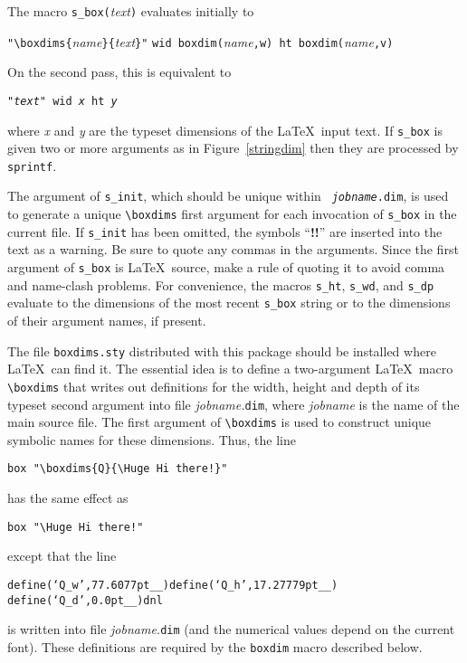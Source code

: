 \noindent The macro \verb|s_box(|{\sl text}\verb|)| evaluates initially to

 \verb|"\boxdims{|{\sl name}\verb|}{|{\sl text}\verb|}"|
  \verb|wid boxdim(|{\sl name}\verb|,w) ht boxdim(|{\sl name}\verb|,v)|

\noindent
On the second pass, this is equivalent to

 {\tt "{\sl text}" wid {\sl x} ht {\sl y}}

 \noindent
 where {\sl x} and {\sl y} are the typeset dimensions of the
 \LaTeX\ input text.  If {\tt s\_box} is given two or more arguments
 as in Figure~\ref{stringdim}
 then they are processed by {\tt sprintf}.

The argument of {\tt s\_init}, which should be unique within {\tt{\sl
jobname}.dim}, is used to generate a unique \verb|\boxdims| first
argument for each invocation of \verb|s_box| in the current file.  If
\verb|s_init| has been omitted, the symbols ``{\bf !!}'' are inserted
into the text as a warning.  Be sure to quote any commas in the
arguments.  Since the first argument of {\tt s\_box} is \LaTeX\ source,
make a rule of quoting it to avoid comma and name-clash problems.  For
convenience, the macros {\tt s\_ht}, {\tt s\_wd}, and {\tt s\_dp}
evaluate to the dimensions of the most recent {\tt s\_box} string or to
the dimensions of their argument names, if present.

The file \verb|boxdims.sty| distributed with this package should be installed
where \LaTeX\ can find it.
The essential idea is to define a two-argument \LaTeX\ macro
\verb|\boxdims| that writes out definitions for the width, height and
depth of its typeset second argument into file {\sl jobname.}\verb|dim|,
where {\sl jobname} is the name of the main source file.
The first argument of \verb|\boxdims| is used to construct unique symbolic
names for these dimensions. 
Thus, the line

{\tt box \verb|"\boxdims{Q}{\Huge Hi there!}"| }

\noindent has the same effect as

{\tt box \verb|"\Huge Hi there!"|}

\noindent except that the line

{\tt define(`Q\_w',77.6077pt\_\_)define(`Q\_h',17.27779pt\_\_)%
define(`Q\_d',0.0pt\_\_)dnl}

\noindent is written into file {\sl jobname.}\verb|dim|
(and the numerical values depend on the current font).
These definitions are required by the \verb|boxdim| macro
described below.

